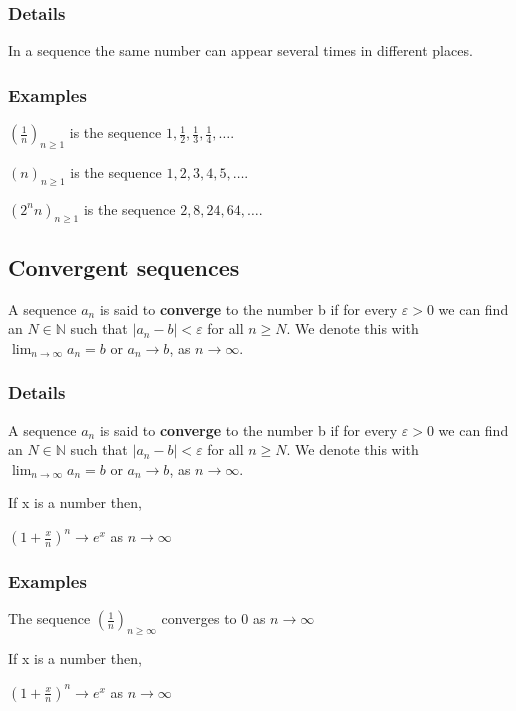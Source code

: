 \documentclass[12pt,a4paper]{article}
\theoremstyle{regla}
\theoremstyle{remark}
\theoremstyle{definition}
\theoremstyle{nonumberbreak}
\begin{document}
\subsubsection{Details}
In a sequence the same number can appear several times in different places.
\subsubsection{Examples}
\begin{xmpl}

$(\frac{1}{n})_{n\geq1}$ is the sequence $1,\frac{1}{2}, \frac{1}{3}, \frac{1}{4}, \ldots$.
\end{xmpl}
\begin{xmpl}

$(n)_{n\geq1}$ is the sequence $1,2,3,4,5,\ldots$.
\end{xmpl}
\begin{xmpl}

$(2^nn)_{n\geq1}$ is the sequence $2,8, 24, 64,\ldots$.
\end{xmpl}

\subsection{Convergent sequences}
\begin{fbox}
\begin{minipage}{0.97\textwidth}
A sequence $a_n$ is said to {\bf converge} to the number b if for every $\varepsilon >0$ we can find an $N\in \mathbb{N}$ such that $|a_n-b| < \varepsilon$ for all $n \geq N$. We denote this with $\lim_{n\to\infty}a_n=b$ or $a_n\to b$, as $n\to\infty$.
\end{minipage}
\end{fbox}
\subsubsection{Details}
A sequence $a_n$ is said to {\bf converge} to the number b if for every $\varepsilon >0$ we can find an $N\in \mathbb{N}$ such that $|a_n-b| < \varepsilon$ for all $n \geq N$. We denote this with $\lim_{n\to\infty}a_n=b$ or $a_n\to b$, as $n\to\infty$.


If x is a number then,

$ (1 + \frac{x}{n})^n \rightarrow e^x$ as $n\rightarrow\infty$




\subsubsection{Examples}
\begin{xmpl}

The sequence $(\frac{1}{n})_{n\geq\infty}$ converges to $0$ as $n\to\infty$
\end{xmpl}
\begin{xmpl}

If x is a number then,

$ (1 + \frac{x}{n})^n \rightarrow e^x$ as $n\rightarrow\infty$
\end{xmpl}
\end{document}

